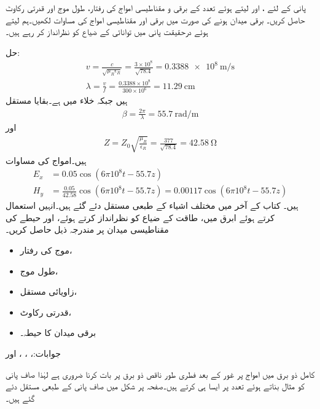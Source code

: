 پانی کے لئے ،  اور  لیتے ہوئے  تعدد کے برقی و مقناطیسی امواج کی رفتار، طول موج اور قدرتی رکاوٹ حاصل کریں۔ برقی میدان  ہونے کی صورت میں برقی اور مقناطیسی امواج کی مساوات لکھیں۔ہم  لیتے ہوئے درحقیقت پانی میں توانائی کے ضیاع کو نظرانداز کر رہے ہیں۔

حل:
\begin{align*}
v=\frac{c}{\sqrt{\mu_R \epsilon_R}}=\frac{3 \times 10^8}{\sqrt{78.4}}=\SI{0.3388e8}{\meter \per \second}\\
\lambda=\frac{v}{f}=\frac{0.3388 \times 10^8}{300 \times 10^6}=\SI{11.29}{\centi\meter}
\end{align*}
ہیں جبکہ خلاء میں  ہے۔بقایا مستقل
\begin{align*}
\beta=\frac{2\pi}{\lambda}=\SI{55.7}{\radian \per \meter}
\end{align*}
اور
\begin{align*}
Z=Z_0 \sqrt{\frac{\mu_R}{\epsilon_R}}=\frac{377}{\sqrt{78.4}}=\SI{42.58}{\ohm}
\end{align*}
ہیں۔امواج کی مساوات
\begin{align*}
E_x&=0.05 \cos (6\pi 10^8 t -55.7 z)\\
H_y&=\frac{0.05}{42.58} \cos (6\pi 10^8 t -55.7 z)=0.00117 \cos (6\pi 10^8 t -55.7 z)
\end{align*}
ہیں۔
کتاب کے آخر میں مختلف اشیاء کے طبعی مستقل دئے گئے ہیں۔انہیں استعمال کرتے ہوئے  ابرق میں، طاقت کے ضیاع کو نظرانداز کرتے ہوئے،   اور  حیطے  کی مقناطیسی میدان پر مندرجہ ذیل حاصل کریں۔
\begin{itemize}
\item
موج کی رفتار،
\item
طول موج،
\item
زاویائی مستقل،
\item
قدرتی رکاوٹ،
\item
برقی میدان کا حیطہ۔
\end{itemize} 

جوابات:، ، ،  اور 

کامل ذو برق میں امواج پر غور کے بعد فطری طور ناقص ذو برق پر بات کرنا ضروری ہے لہٰذا صاف پانی کو مثال بناتے ہوئے    تعدد پر  ایسا ہی کرتے ہیں۔صفحہ  پر شکل  میں صاف پانی کے طبعی مستقل دئے گئے ہیں۔

